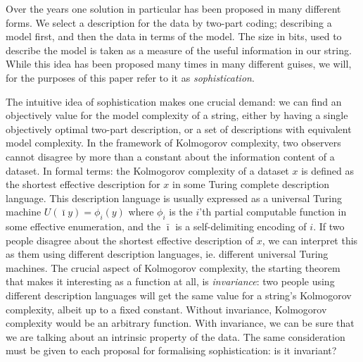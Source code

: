 \documentclass{style/llncs}
\begin{document}
Over the years one solution in particular has been proposed in many different forms. We select a description for the data by two-part coding; describing a model first, and then the data in terms of the model. The size in bits, used to describe the model is taken as a measure of the useful information in our string. While this idea has been proposed many times in many different guises, we will, for the purposes of this paper refer to it as \emph{sophistication}\footnotemark. 


The intuitive idea of sophistication makes one crucial demand: we can find an objectively value for the model complexity of a string, either by having a single objectively optimal two-part description, or a set of descriptions with equivalent model complexity. In the framework of Kolmogorov complexity, two observers cannot disagree by more than a constant about the information content of a dataset. In formal terms: the Kolmogorov complexity of a dataset $x$ is defined as the shortest effective description for $x$ in some Turing complete description language. This description language is usually expressed as a universal Turing machine $U(\bar\imath y) = \phi_i(y)$ where $\phi_i$ is the $i$'th partial computable function in some effective enumeration, and the $\bar\imath$ is a self-delimiting encoding of $i$. If two people disagree about the shortest effective description of $x$, we can interpret this as them using different description languages, ie. different universal Turing machines. The crucial aspect of Kolmogorov complexity, the starting theorem that makes it interesting as a function at all, is \emph{invariance}: two people using different description languages will get the same value for a string's Kolmogorov complexity, albeit up to a fixed constant. Without invariance, Kolmogorov complexity would be an arbitrary function. With invariance, we can be sure that we are talking about an intrinsic property of the data. The same consideration must be given to each proposal for formalising sophistication: is it invariant? 
\end{document}
